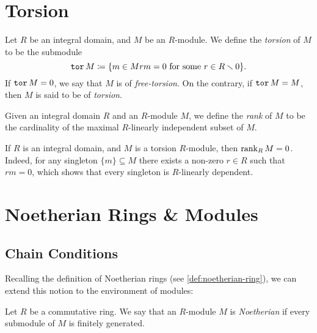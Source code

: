 \section{Torsion}

\begin{definition}[Torsion]
    \label{def:torsion-module}
    Let \(R\) be an integral domain, and \(M\) be an \(R\)-module. We define the
    \emph{torsion} of \(M\) to be the submodule
    \[
        \operatorname{\texttt{tor}} M \coloneq
        \{m \in M \relax r m = 0 \text{ for some } r \in R \smallsetminus 0\}.
    \]
    If \(\operatorname{\texttt{tor}} M = 0\), we say that \(M\) is of \emph{free-torsion}. On the
    contrary, if \(\operatorname{\texttt{tor}} M = M\), then \(M\) is said to be of \emph{torsion}.
\end{definition}

\begin{definition}[Rank]
    \label{def:rank-of-general-module}
    Given an integral domain \(R\) and an \(R\)-module \(M\), we define the
    \emph{rank} of \(M\) to be the cardinality of the maximal \(R\)-linearly
    independent subset of \(M\).
\end{definition}

\begin{example}
    \label{exp:torsion-module-has-rank-zero}
    If \(R\) is an integral domain, and \(M\) is a torsion \(R\)-module, then
    \(\operatorname{rank}_R M = 0\). Indeed, for any singleton \(\{m\} \subseteq M\) there exists
    a non-zero \(r \in R\) such that \(r m = 0\), which shows that every singleton
    is \(R\)-linearly dependent.
\end{example}

\section{Noetherian Rings \& Modules}

\subsection{Chain Conditions}

Recalling the definition of Noetherian rings (see \cref{def:noetherian-ring}),
we can extend this notion to the environment of modules:

\begin{definition}
    \label{def:noetherian-module}
    Let \(R\) be a commutative ring. We say that an \(R\)-module \(M\) is
    \emph{Noetherian} if every submodule of \(M\) is finitely generated.
\end{definition}

